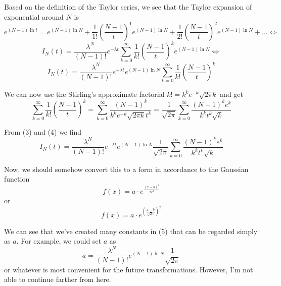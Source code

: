 \documentclass[notitlepage,12pt]{article}
\begin{document}
	Based on the definition of the Taylor series, we see that the Taylor expansion of exponential around $N$ is 
	\begin{equation*}
	e^{(N-1)\ln t} = e^{(N-1)\ln N} + \frac{1}{1!} \left(\frac{N-1}{t}\right)^1 e^{(N-1)\ln N} + \frac{1}{2!} \left(\frac{N-1}{t}\right)^2 e^{(N-1)\ln N} + ... \Leftrightarrow
	\end{equation*}
	\begin{equation*}
	I_N(t) =  \dfrac{\lambda^N}{(N-1)!} e^{-\lambda t} \sum_{k=0}^{\infty} \frac{1}{k!} \left(\frac{N-1}{t}\right)^k e^{(N-1)\ln N}  \Leftrightarrow
	\end{equation*}
	\begin{equation}
	I_N(t) =  \dfrac{\lambda^N}{(N-1)!} e^{-\lambda t} e^{(N-1)\ln N} \sum_{k=0}^{\infty} \frac{1}{k!} \left(\frac{N-1}{t}\right)^k
	\end{equation}
	
	We can now use the Stirling's approximate factorial $k! = k^k e^{-k} \sqrt{2\pi k}$ and get
	\begin{equation}
	\sum_{k=0}^{\infty} \frac{1}{k!} \left(\frac{N-1}{t}\right)^k = \sum_{k=0}^{\infty} \frac{(N-1)^k}{k^k e^{-k} \sqrt{2\pi k}t^k} = \frac{1}{\sqrt{2\pi}} \sum_{k=0}^{\infty} \frac{(N-1)^k e^k}{k^k t^k \sqrt{k}}
	\end{equation}
	
	From (3) and (4) we find
	\begin{equation}
	I_N(t) =  \dfrac{\lambda^N}{(N-1)!} e^{-\lambda t} e^{(N-1)\ln N} \frac{1}{\sqrt{2\pi}} \sum_{k=0}^{\infty} \frac{(N-1)^k e^k}{k^k t^k \sqrt{k}}
	\end{equation}
	
	Now, we should somehow convert this to a form in accordance to the Gaussian function
	\begin{equation*}
	f(x) = a \cdot e^{\frac{(x-b)^2}{2c^2}}
	\end{equation*}
	or
	\begin{equation*}
	f(x) = a \cdot e^{\left(\frac{x-b}{\sqrt{2}c}\right)^2}
	\end{equation*}
	
	We can see that we've created many constants in (5) that can be regarded simply as $a$. For example, we could set $a$ as
	\begin{equation*}
	a =  \dfrac{\lambda^N}{(N-1)!} e^{(N-1)\ln N} \frac{1}{\sqrt{2\pi}}
	\end{equation*}
	or whatever is most convenient for the future transformations.
	However, I'm not able to continue farther from here.
	
\end{document}
